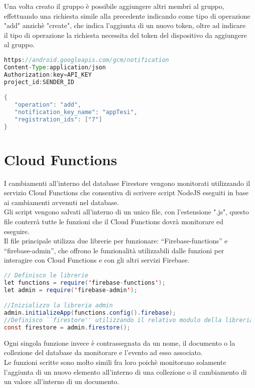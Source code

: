Una volta creato il gruppo è possibile aggiungere altri membri al gruppo, effettuando una richiesta simile alla precedente indicando come tipo di operazione "add" anzichè "create", che indica l'aggiunta di un nuovo token, oltre ad indicare il tipo di operazione la richiesta necessita del token del dispositivo da aggiungere al gruppo.

\begin{lstlisting}[language=java,caption={Creazione token FCM}]
https://android.googleapis.com/gcm/notification
Content-Type:application/json
Authorization:key=API_KEY
project_id:SENDER_ID

{
   "operation": "add",
   "notification_key_name": "appTesi",
   "registration_ids": ["7"]
}
\end{lstlisting}

\section{Cloud Functions}
I cambiamenti all'interno del database Firestore vengono monitorati utilizzando il servizio Cloud Functions che consentiva di scrivere script NodeJS eseguiti in base ai cambiamenti avvenuti nel database.\\
Gli script vengono salvati all'interno di un unico file, con l'estensione ".js", questo file conterrà tutte le funzioni che il Cloud Functions dovrà monitorare ed eseguire.\\
Il file principale utilizza due librerie per funzionare: ``Firebase-functions'' e ``firebase-admin'', che offrono le funzionalità utilizzabili dalle funzioni per interagire con Cloud Functions e con gli altri servizi Firebase.

\begin{lstlisting}[language=java,caption={Librerie utilizzate per interagire con il servizio Cloud Functions }]
// Definisco le librerie
let functions = require('firebase-functions');
let admin = require('firebase-admin');

//Inizializzo la libreria admin
admin.initializeApp(functions.config().firebase);
//Definisco ``firestore'' utilizzando il relativo modulo della libreria admin
const firestore = admin.firestore();
\end{lstlisting}

Ogni singola funzione invece è contrassegnata da un nome, il documento o la collezione del database da monitorare e l'evento ad esso associato.\\
Le funzioni scritte sono molto simili fra loro poichè monitorano solamente l'aggiunta di un nuovo elemento all'interno di una collezione o il cambiamento di un valore all'interno di un documento.\\

